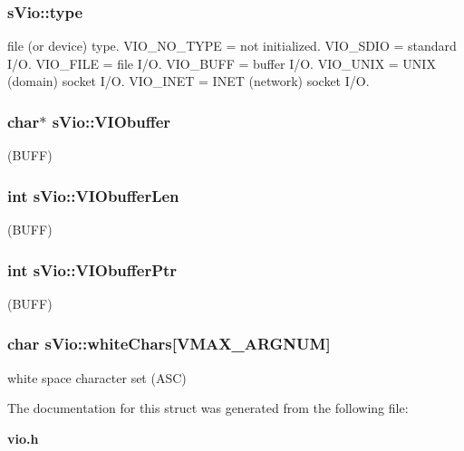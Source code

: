 \subsubsection[{type}]{ s\-Vio\-::type}\label{a00002_a10ff01c784656edf59de7290943d2bb8}
file (or device) type. V\-I\-O\-\_\-\-N\-O\-\_\-\-T\-Y\-P\-E = not initialized. V\-I\-O\-\_\-\-S\-D\-I\-O = standard I/\-O. V\-I\-O\-\_\-\-F\-I\-L\-E = file I/\-O. V\-I\-O\-\_\-\-B\-U\-F\-F = buffer I/\-O. V\-I\-O\-\_\-\-U\-N\-I\-X = U\-N\-I\-X (domain) socket I/\-O. V\-I\-O\-\_\-\-I\-N\-E\-T = I\-N\-E\-T (network) socket I/\-O. 
\subsubsection[{V\-I\-Obuffer}]{\setlength{\rightskip}{0pt plus 5cm}char$\ast$ s\-Vio\-::\-V\-I\-Obuffer}\label{a00002_ad05a71a18ce91d54c9e90f6f24a6e0d5}
(B\-U\-F\-F) 
\subsubsection[{V\-I\-Obuffer\-Len}]{\setlength{\rightskip}{0pt plus 5cm}int s\-Vio\-::\-V\-I\-Obuffer\-Len}\label{a00002_aaa457bd84691d96861e3c7792006517c}
(B\-U\-F\-F) 
\subsubsection[{V\-I\-Obuffer\-Ptr}]{\setlength{\rightskip}{0pt plus 5cm}int s\-Vio\-::\-V\-I\-Obuffer\-Ptr}\label{a00002_a615098ef767bb9dd01bd2629b1b8d8be}
(B\-U\-F\-F) 
\subsubsection[{white\-Chars}]{\setlength{\rightskip}{0pt plus 5cm}char s\-Vio\-::white\-Chars[{\bf V\-M\-A\-X\-\_\-\-A\-R\-G\-N\-U\-M}]}\label{a00002_aa478abe4d4059c9b597ffc3181b9460e}
white space character set (A\-S\-C) 

The documentation for this struct was generated from the following file\-:\begin{DoxyCompactItemize}
\item 
{\bf vio.\-h}\end{DoxyCompactItemize}
